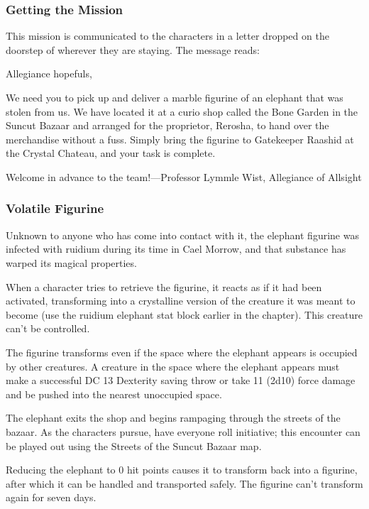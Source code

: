 \documentclass[10pt,a4paper,twoside,bg=print,twocolumn,openany,nodeprecatedcode]{dndbook}
\begin{document}
\subsubsection{Getting the Mission}
This mission is communicated to the characters in a letter dropped on the doorstep of wherever they are staying. The message reads:

\begin{DndReadAloud}{}
Allegiance hopefuls,

We need you to pick up and deliver a marble figurine of an elephant that was stolen from us. We have located it at a curio shop called the Bone Garden in the Suncut Bazaar and arranged for the proprietor, Rerosha, to hand over the merchandise without a fuss. Simply bring the figurine to Gatekeeper Raashid at the Crystal Chateau, and your task is complete.

Welcome in advance to the team!—Professor Lymmle Wist, Allegiance of Allsight

\end{DndReadAloud}

\subsubsection{Volatile Figurine}
Unknown to anyone who has come into contact with it, the elephant figurine was infected with ruidium during its time in Cael Morrow, and that substance has warped its magical properties.

When a character tries to retrieve the figurine, it reacts as if it had been activated, transforming into a crystalline version of the creature it was meant to become (use the ruidium elephant stat block earlier in the chapter). This creature can't be controlled.

The figurine transforms even if the space where the elephant appears is occupied by other creatures. A creature in the space where the elephant appears must make a successful DC 13 Dexterity saving throw or take 11 (2d10) force damage and be pushed into the nearest unoccupied space.

The elephant exits the shop and begins rampaging through the streets of the bazaar. As the characters pursue, have everyone roll initiative; this encounter can be played out using the Streets of the Suncut Bazaar map.

Reducing the elephant to 0 hit points causes it to transform back into a figurine, after which it can be handled and transported safely. The figurine can't transform again for seven days.
\end{document}

